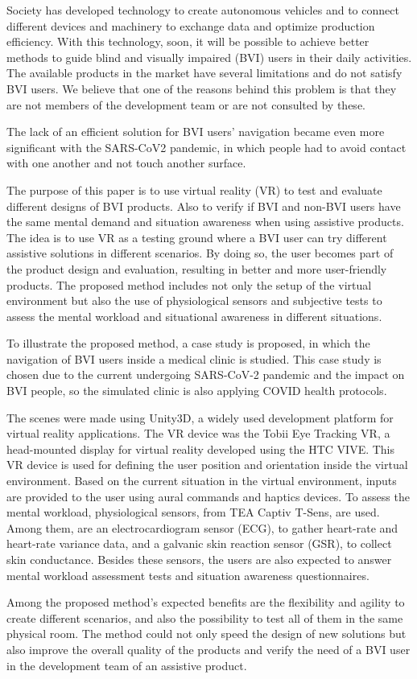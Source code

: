 
Society has developed technology to create autonomous vehicles and to connect different devices and machinery to exchange data and optimize production efficiency.  With this technology, soon, it will be possible to achieve better methods to guide blind and visually impaired (BVI) users in their daily activities. The available products in the market have several limitations and do not satisfy BVI users. We believe that one of the reasons behind this problem is that they are not members of the development team or are not consulted by these. 

The lack of an efficient solution for BVI users' navigation became even more significant with the SARS-CoV2 pandemic, in which people had to avoid contact with one another and not touch another surface.

The purpose of this paper is to use virtual reality (VR) to test and evaluate different designs of BVI products. Also to verify if BVI and non-BVI users have the same mental demand and situation awareness when using assistive products. The idea is to use VR as a testing ground where a BVI user can try different assistive solutions in different scenarios. By doing so, the user becomes part of the product design and evaluation, resulting in better and more user-friendly products. The proposed method includes not only the setup of the virtual environment but also the use of physiological sensors and subjective tests to assess the mental workload and situational awareness in different situations.

To illustrate the proposed method, a case study is proposed, in which the navigation of BVI users inside a medical clinic is studied. This case study is chosen due to the current undergoing SARS-CoV-2 pandemic and the impact on BVI people, so the simulated clinic is also applying COVID health protocols.

The scenes were made using Unity3D, a widely used development platform for virtual reality applications. The VR device was the Tobii Eye Tracking VR, a head-mounted display for virtual reality developed using the HTC VIVE. This VR device is used for defining the user position and orientation inside the virtual environment. Based on the current situation in the virtual environment, inputs are provided to the user using aural commands and haptics devices. To assess the mental workload, physiological sensors, from TEA Captiv T-Sens, are used. Among them, are an electrocardiogram sensor (ECG), to gather heart-rate and heart-rate variance data, and a galvanic skin reaction sensor (GSR), to collect skin conductance. Besides these sensors, the users are also expected to answer mental workload assessment tests and situation awareness questionnaires.

Among the proposed method's expected benefits are the flexibility and agility to create different scenarios, and also the possibility to test all of them in the same physical room. The method could not only speed the design of new solutions but also improve the overall quality of the products and verify the need of a BVI user in the development team of an assistive product.